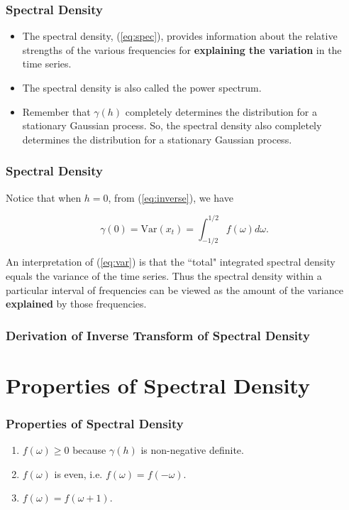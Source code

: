 \documentclass[%
xcolor=pdftex]{beamer}
\begin{document}
\begin{frame}
\frametitle{Spectral Density}

\begin{itemize}
\item The spectral density, (\ref{eq:spec}), provides information about the relative strengths of the various frequencies for \textbf{explaining the variation} in the time series.
\item The spectral density is also called the power spectrum.  
\item Remember
that $\gamma(h)$ completely determines the distribution for a
stationary Gaussian process.  So, the spectral density also
completely determines the distribution for a
stationary Gaussian process.
\end{itemize}

\end{frame}

\begin{frame}
\frametitle{Spectral Density}


Notice that when $h=0$, from (\ref{eq:inverse}), we have

\begin{equation} \label{eq:var}
\gamma(0) = \mbox{Var}(x_t) = \int^{1/2}_{-1/2} f(\omega) d\omega.
\end{equation}

An interpretation of (\ref{eq:var}) is that the ``total" integrated spectral density equals the variance of the time series.  Thus the spectral density within a particular interval of frequencies can be viewed as the amount of the variance \textbf{explained} by those frequencies.

\end{frame}


\begin{frame}
\frametitle{Derivation of Inverse Transform of Spectral Density}

\end{frame}



\section{Properties of Spectral Density}
\frame{\tableofcontents[currentsection]}

\begin{frame}
\frametitle{Properties of Spectral Density}

\begin{enumerate}
\item $f(\omega) \geq 0$ because $\gamma(h)$ is non-negative definite.
\item $f(\omega)$ is even, i.e. $f(\omega) = f(-\omega)$.
\item $f(\omega) = f(\omega+1)$.
\end{enumerate}



\end{frame}
\end{document}
